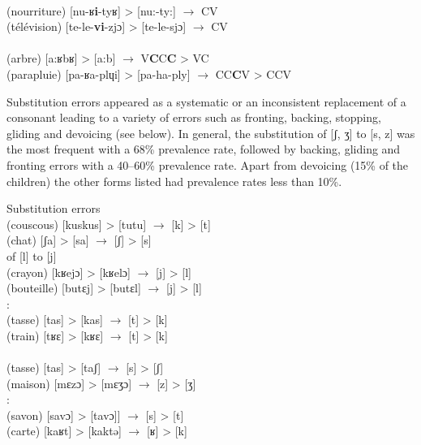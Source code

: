 \documentclass[output=paper,newtxmath,modfonts,nonflat,draftmode]{langsci/langscibook}
\begin{document}
\ex{}\\
(nourriture) [nu-ʁ\textbf{i}-tyʁ] > [nu:-ty:] $\rightarrow$ CV\\
(télévision) [te-le-\textbf{vi}-zjɔ] > [te-le-sjɔ] $\rightarrow$ CV\\

\ex{}\\ 
(arbre)  [a:ʁbʁ] > [a:b] $\rightarrow$ V\textbf{C}C\textbf{C} > VC\\
(parapluie) [pa-ʁa-plɥi] > [pa-ha-ply] $\rightarrow$ CC\textbf{C}V > CCV\\
\z
\z

Substitution errors appeared as a systematic or an inconsistent replacement of a consonant leading to a variety of errors such as fronting, backing, stopping, gliding and devoicing (see  below). In general, the substitution of [ʃ, ʒ] to [s, z] was the most frequent with a 68\% prevalence rate, followed by backing, gliding and fronting errors with a 40--60\% prevalence rate. Apart from devoicing (15\% of the children) the other forms listed had prevalence rates less than 10\%.

\ea Substitution errors \label{ex:takam:substitution_errors}
\ea {}\\
(couscous) [kuskus] > [tutu] $\rightarrow$ [k] > [t]\\
(chat) [ʃa] > [sa] $\rightarrow$ [ʃ] > [s]\\

\ex{} {of} {[l]} {to} {[j]}\\
 (crayon) [kʁejɔ] > [kʁelɔ] $\rightarrow$ [j] > [l]\\ 
(bouteille) [butɛj] > [butɛl] $\rightarrow$ [j] > [l]\\

\ex{}: \\
(tasse) [tas] > [kas] $\rightarrow$ [t] > [k]\\
(train) [tʁɛ] > [kʁɛ] $\rightarrow$ [t] > [k]\\

\ex{}\\ 
(tasse) [tas] > [taʃ] $\rightarrow$ [s] > [ʃ]\\
(maison) [mɛzɔ] > [mɛʒɔ] $\rightarrow$ [z] > [ʒ] \\

\ex{}: \\
(savon) [savɔ] > [tavɔ]] $\rightarrow$ [s] > [t]\\ 
(carte) [kaʁt] > [kaktə] $\rightarrow$ [ʁ] > [k]\\
\end{document}
